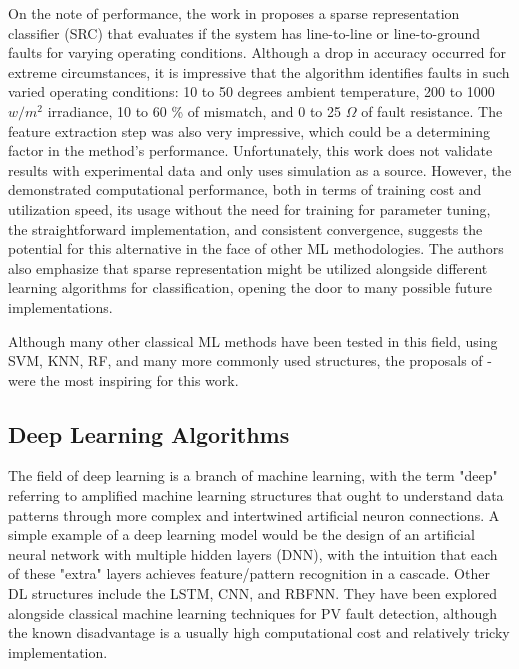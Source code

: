 On the note of performance, the work in \cite{Kilic2020} proposes a sparse representation classifier (SRC) that evaluates if the system has line-to-line or line-to-ground faults for varying operating conditions. Although a drop in accuracy occurred for extreme circumstances, it is impressive that the algorithm identifies faults in such varied operating conditions: 10 to 50 degrees ambient temperature, 200 to 1000 $w/m^2$ irradiance, 10 to 60 \% of mismatch, and 0 to 25 $\Omega$ of fault resistance. The feature extraction step was also very impressive, which could be a determining factor in the method's performance. Unfortunately, this work does not validate results with experimental data and only uses simulation as a source. However, the demonstrated computational performance, both in terms of training cost and utilization speed, its usage without the need for training for parameter tuning, the straightforward implementation, and consistent convergence, suggests the potential for this alternative in the face of other ML methodologies. The authors also emphasize that sparse representation might be utilized alongside different learning algorithms for classification, opening the door to many possible future implementations.

Although many other classical ML methods have been tested in this field, using SVM, KNN, RF, and many more commonly used structures, the proposals of \cite{Rao2021}-\cite{Kilic2020} were the most inspiring for this work.

\subsection{Deep Learning Algorithms}

The field of deep learning is a branch of machine learning, with the term "deep" referring to amplified machine learning structures that ought to understand data patterns through more complex and intertwined artificial neuron connections. A simple example of a deep learning model would be the design of an artificial neural network with multiple hidden layers (DNN), with the intuition that each of these "extra" layers achieves feature/pattern recognition in a cascade. Other DL structures include the LSTM, CNN, and RBFNN. They have been explored alongside classical machine learning techniques for PV fault detection, although the known disadvantage is a usually high computational cost and relatively tricky implementation.


